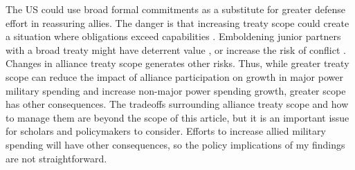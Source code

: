 \documentclass[12pt]{article}
\begin{document}
The US could use broad formal commitments as a substitute for greater defense effort in reassuring allies.
The danger is that increasing treaty scope could create a situation where obligations exceed capabilities \citep{Kennedy1987}. 
Emboldening junior partners with a broad treaty might have deterrent value \citep{Bensonetal2014}, or increase the risk of conflict \citep{Benson2012}.
Changes in alliance treaty scope generates other risks.
Thus, while greater treaty scope can reduce the impact of alliance participation on growth in major power military spending and increase non-major power spending growth, greater scope has other consequences. 
The tradeoffs surrounding alliance treaty scope and how to manage them are beyond the scope of this article, but it is an important issue for scholars and policymakers to consider. 
Efforts to increase allied military spending will have other consequences, so the policy implications of my findings are not straightforward. 

 



\singlespace
 
 
\end{document}
